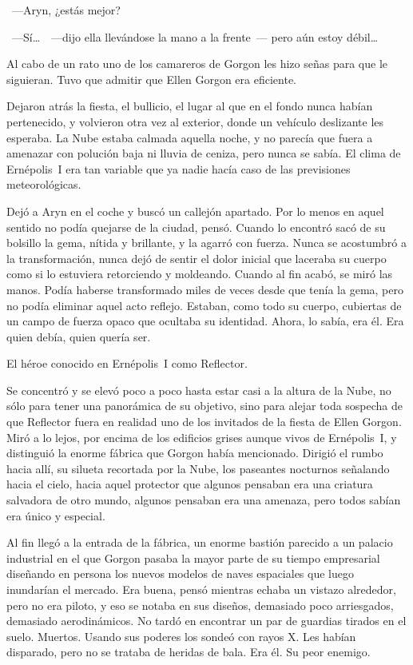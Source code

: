 ~---Aryn, ¿estás mejor?

~---Sí\dots\ ~---dijo ella llevándose la mano a la frente~--- pero aún estoy débil\dots

Al cabo de un rato uno de los camareros de Gorgon les hizo señas para que le siguieran. Tuvo que admitir que Ellen Gorgon era eficiente.

Dejaron atrás la fiesta, el bullicio, el lugar al que en el fondo nunca habían pertenecido, y volvieron otra vez al exterior, donde un vehículo deslizante les esperaba. La Nube estaba calmada aquella noche, y no parecía que fuera a amenazar con polución baja ni lluvia de ceniza, pero nunca se sabía. El clima de Ernépolis~I era tan variable que ya nadie hacía caso de las previsiones meteorológicas.

Dejó a Aryn en el coche y buscó un callejón apartado. Por lo menos en aquel sentido no podía quejarse de la ciudad, pensó. Cuando lo encontró sacó de su bolsillo la gema, nítida y brillante, y la agarró con fuerza. Nunca se acostumbró a la transformación, nunca dejó de sentir el dolor inicial que laceraba su cuerpo como si lo estuviera retorciendo y moldeando. Cuando al fin acabó, se miró las manos. Podía haberse transformado miles de veces desde que tenía la gema, pero no podía eliminar aquel acto reflejo. Estaban, como todo su cuerpo, cubiertas de un campo de fuerza opaco que ocultaba su identidad. Ahora, lo sabía, era él. Era quien debía, quien quería ser.

El héroe conocido en Ernépolis~I como Reflector.

Se concentró y se elevó poco a poco hasta estar casi a la altura de la Nube, no sólo para tener una panorámica de su objetivo, sino para alejar toda sospecha de que Reflector fuera en realidad uno de los invitados de la fiesta de Ellen Gorgon. Miró a lo lejos, por encima de los edificios grises aunque vivos de Ernépolis~I, y distinguió la enorme fábrica que Gorgon había mencionado. Dirigió el rumbo hacia allí, su silueta recortada por la Nube, los paseantes nocturnos señalando hacia el cielo, hacia aquel protector que algunos pensaban era una criatura salvadora de otro mundo, algunos pensaban era una amenaza, pero todos sabían era único y especial.

Al fin llegó a la entrada de la fábrica, un enorme bastión parecido a un palacio industrial en el que Gorgon pasaba la mayor parte de su tiempo empresarial diseñando en persona los nuevos modelos de naves espaciales que luego inundarían el mercado. Era buena, pensó mientras echaba un vistazo alrededor, pero no era piloto, y eso se notaba en sus diseños, demasiado poco arriesgados, demasiado aerodinámicos. No tardó en encontrar un par de guardias tirados en el suelo. Muertos. Usando sus poderes los sondeó con rayos X. Les habían disparado, pero no se trataba de heridas de bala. Era él. Su peor enemigo.

